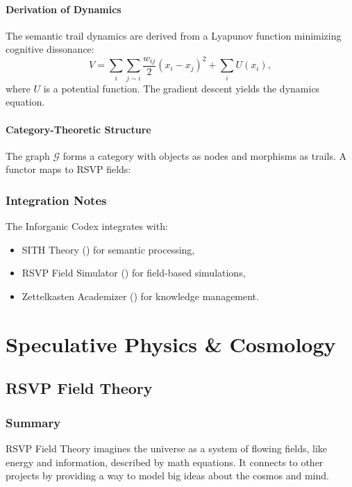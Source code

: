 \documentclass[11pt,oneside]{memoir}
\theoremstyle{plain}
\newcommand{\F}{\mathcal{F}}
\begin{document}
\subsection{Derivation of Dynamics}
The semantic trail dynamics are derived from a Lyapunov function minimizing cognitive dissonance:
\begin{equation}
    V = \sum_i \sum_{j \sim i} \frac{w_{ij}}{2} (x_i - x_j)^2 + \sum_i U(x_i),
\end{equation}
where \(U\) is a potential function. The gradient descent yields the dynamics equation.

\subsection{Category-Theoretic Structure}
The graph \(\mathcal{G}\) forms a category with objects as nodes and morphisms as trails. A functor maps to RSVP fields:

\section{Integration Notes}
The Inforganic Codex integrates with:
\begin{itemize}
    \item SITH Theory () for semantic processing,
    \item RSVP Field Simulator () for field-based simulations,
    \item Zettelkasten Academizer () for knowledge management.
\end{itemize}

\part{Speculative Physics \& Cosmology}
\chapter{RSVP Field Theory}
\label{sec:rsvp_field}
\section{Summary}
RSVP Field Theory imagines the universe as a system of flowing fields, like energy and information, described by math equations. It connects to other projects by providing a way to model big ideas about the cosmos and mind.
\end{document}
